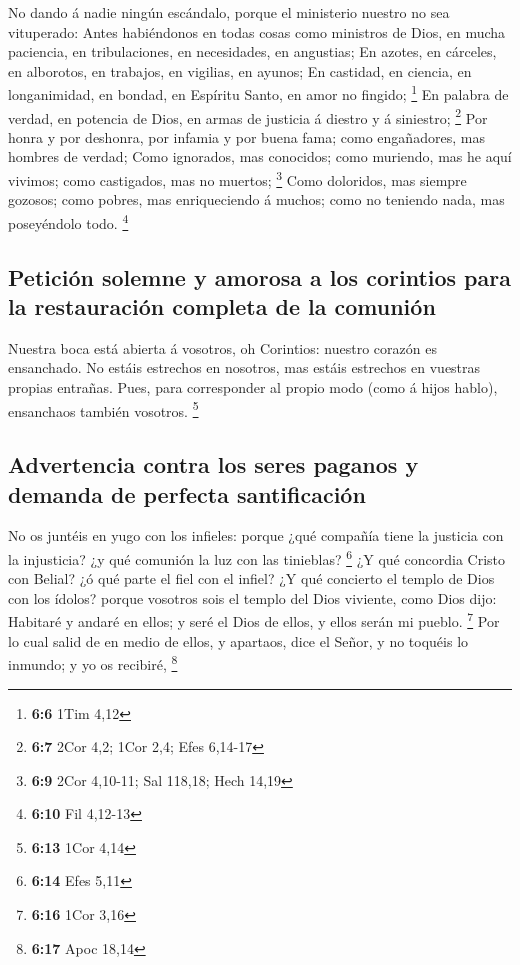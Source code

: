  No dando á nadie ningún escándalo, porque el ministerio
nuestro no sea vituperado:  Antes habiéndonos en todas cosas
como ministros de Dios, en mucha paciencia, en tribulaciones, en
necesidades, en angustias;  En azotes, en cárceles, en
alborotos, en trabajos, en vigilias, en ayunos;  En
castidad, en ciencia, en longanimidad, en bondad, en Espíritu Santo, en
amor no fingido; \footnote{\textbf{6:6} 1Tim 4,12}  En
palabra de verdad, en potencia de Dios, en armas de justicia á diestro y
á siniestro; \footnote{\textbf{6:7} 2Cor 4,2; 1Cor 2,4; Efes 6,14-17}
 Por honra y por deshonra, por infamia y por buena fama;
como engañadores, mas hombres de verdad;  Como ignorados,
mas conocidos; como muriendo, mas he aquí vivimos; como castigados, mas
no muertos; \footnote{\textbf{6:9} 2Cor 4,10-11; Sal 118,18; Hech 14,19}
 Como doloridos, mas siempre gozosos; como pobres, mas
enriqueciendo á muchos; como no teniendo nada, mas poseyéndolo todo.
\footnote{\textbf{6:10} Fil 4,12-13}

\hypertarget{peticiuxf3n-solemne-y-amorosa-a-los-corintios-para-la-restauraciuxf3n-completa-de-la-comuniuxf3n}{%
\subsection{Petición solemne y amorosa a los corintios para la
restauración completa de la
comunión}\label{peticiuxf3n-solemne-y-amorosa-a-los-corintios-para-la-restauraciuxf3n-completa-de-la-comuniuxf3n}}

 Nuestra boca está abierta á vosotros, oh Corintios:
nuestro corazón es ensanchado.  No estáis estrechos en
nosotros, mas estáis estrechos en vuestras propias entrañas.
 Pues, para corresponder al propio modo (como á hijos
hablo), ensanchaos también vosotros. \footnote{\textbf{6:13} 1Cor 4,14}

\hypertarget{advertencia-contra-los-seres-paganos-y-demanda-de-perfecta-santificaciuxf3n}{%
\subsection{Advertencia contra los seres paganos y demanda de perfecta
santificación}\label{advertencia-contra-los-seres-paganos-y-demanda-de-perfecta-santificaciuxf3n}}

 No os juntéis en yugo con los infieles: porque ¿qué
compañía tiene la justicia con la injusticia? ¿y qué comunión la luz con
las tinieblas? \footnote{\textbf{6:14} Efes 5,11}  ¿Y qué
concordia Cristo con Belial? ¿ó qué parte el fiel con el infiel?
 ¿Y qué concierto el templo de Dios con los ídolos? porque
vosotros sois el templo del Dios viviente, como Dios dijo: Habitaré y
andaré en ellos; y seré el Dios de ellos, y ellos serán mi pueblo.
\footnote{\textbf{6:16} 1Cor 3,16}  Por lo cual salid de en
medio de ellos, y apartaos, dice el Señor, y no toquéis lo inmundo; y yo
os recibiré, \footnote{\textbf{6:17} Apoc 18,14}

